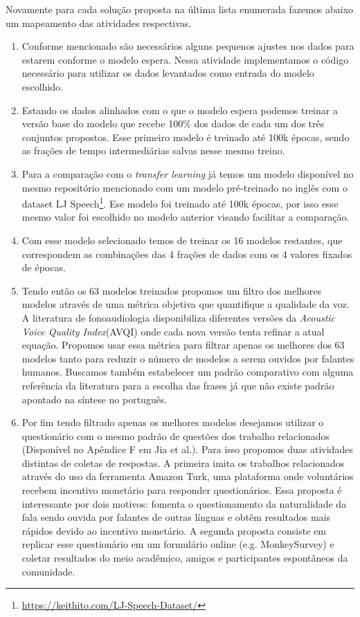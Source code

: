 \documentclass{article}
\begin{document}
Novamente para cada solução proposta na última lista enumerada fazemos abaixo um mapeamento das atividades respectivas.

\begin{enumerate}
	\item Conforme mencionado são necessários alguns pequenos ajustes nos dados para estarem conforme o modelo espera.
	Nessa atividade implementamos o código necessário para utilizar os dados levantados como entrada do modelo escolhido.
	\item Estando os dados alinhados com o que o modelo espera podemos treinar a versão base do modelo que recebe 100\% dos dados de cada um dos três conjuntos propostos.
	Esse primeiro modelo é treinado até 100k épocas, sendo as frações de tempo intermediárias salvas nesse mesmo treino.
	\item Para a comparação com o \textit{transfer learning} já temos um modelo disponível no mesmo repositório mencionado com um modelo pré-treinado no inglês com o dataset LJ Speech\footnote{\url{https://keithito.com/LJ-Speech-Dataset/}}.
	Ese modelo foi treinado até 100k épocas, por isso esse mesmo valor foi escolhido no modelo anterior visando facilitar a comparação.
	\item Com esse modelo selecionado temos de treinar os 16 modelos restantes, que correspondem as combinações das 4 frações de dados com os 4 valores fixados de épocas.
	\item Tendo então os 63 modelos treinados propomos um filtro dos melhores modelos através de uma métrica objetiva que quantifique a qualidade da voz.
	A literatura de fonoaudiologia disponibiliza diferentes versões da \textit{Acoustic Voice Quality Index}(AVQI) onde cada nova versão tenta refinar a atual equação.
	Propomos usar essa métrica para filtrar apenas os melhores dos 63 modelos tanto para reduzir o número de modelos a serem ouvidos por falantes humanos. 
	Buscamos também estabelecer um padrão comparativo com alguma referência da literatura para a escolha das frases já que não existe padrão apontado na síntese no português.
	\item Por fim tendo filtrado apenas os melhores modelos desejamos utilizar o questionário com o mesmo padrão de questões dos trabalho relacionados (Disponível no Apêndice F em Jia et al.\cite{tacotronFamilyQuestionary}).
	Para isso propomos duas atividades distintas de coletas de respostas.
	A primeira imita os trabalhos relacionados através do uso da ferramenta Amazon Turk, uma plataforma onde voluntários recebem incentivo monetário para responder questionários.
	Essa proposta é interessante por dois motivos: fomenta o questionamento da naturalidade da fala sendo ouvida por falantes de outras línguas e obtêm resultados mais rápidos devido ao incentivo monetário.
	A segunda proposta consiste em replicar esse questionário em um formulário online (e.g. MonkeySurvey) e coletar resultados do meio acadêmico, amigos e participantes espontâneos da comunidade.

\end{enumerate}
\end{document}
